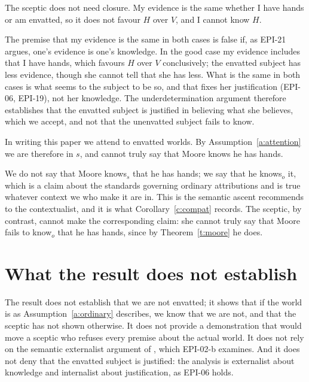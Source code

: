 \documentclass{situationist-preprint}
\begin{document}
\begin{objection}[Underdetermination]
The sceptic does not need closure. My evidence is the same whether I have hands or am envatted, so it does not favour $H$ over $V$, and I cannot know $H$.
\end{objection}

\begin{reply}
The premise that my evidence is the same in both cases is false if, as EPI-21 argues, one's evidence is one's knowledge. In the good case my evidence includes that I have hands, which favours $H$ over $V$ conclusively; the envatted subject has less evidence, though she cannot tell that she has less. What is the same in both cases is what seems to the subject to be so, and that fixes her justification (EPI-06, EPI-19), not her knowledge. The underdetermination argument therefore establishes that the envatted subject is justified in believing what she believes, which we accept, and not that the unenvatted subject fails to know.
\end{reply}

\begin{objection}
In writing this paper we attend to envatted worlds. By Assumption~\ref{a:attention} we are therefore in $s$, and cannot truly say that Moore knows he has hands.
\end{objection}

\begin{reply}
We do not say that Moore knows$_s$ that he has hands; we say that he knows$_o$ it, which is a claim about the standards governing ordinary attributions and is true whatever context we who make it are in. This is the semantic ascent \citet{Lewis1996} recommends to the contextualist, and it is what Corollary~\ref{c:compat} records. The sceptic, by contrast, cannot make the corresponding claim: she cannot truly say that Moore fails to know$_o$ that he has hands, since by Theorem~\ref{t:moore} he does.
\end{reply}

\section{What the result does not establish}

The result does not establish that we are not envatted; it shows that if the world is as Assumption~\ref{a:ordinary} describes, we know that we are not, and that the sceptic has not shown otherwise. It does not provide a demonstration that would move a sceptic who refuses every premise about the actual world. It does not rely on the semantic externalist argument of \citet{Putnam1981}, which EPI-02-b examines. And it does not deny that the envatted subject is justified: the analysis is externalist about knowledge and internalist about justification, as EPI-06 holds.
\end{document}
